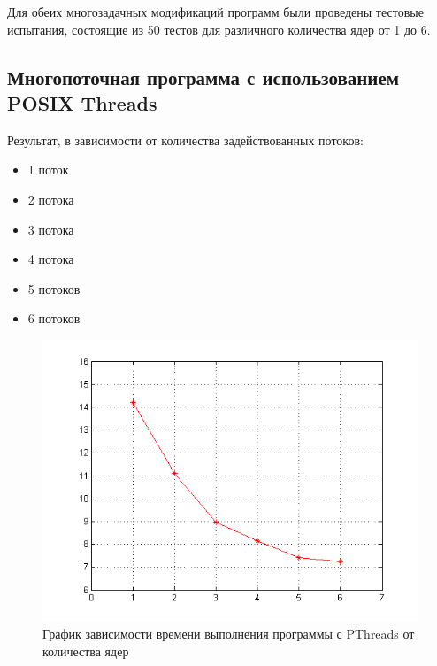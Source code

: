 Для обеих многозадачных модификаций программ были проведены тестовые испытания, состоящие из 50 тестов для различного количества ядер от 1 до 6.


\subsection{Многопоточная программа с использованием POSIX Threads}

Результат, в зависимости от количества задействованных потоков:

\begin{itemize}
	\item 1 поток
		
	\item 2 потока
		
	\item 3 потока
		
	\item 4 потока
		
	\item 5 потоков
		
	\item 6 потоков
		
\end{itemize}

\begin{figure}[H]
	\begin{center}
		\includegraphics[scale=0.7]{pic/posix.png}
		\caption{График зависимости времени выполнения программы с PThreads от количества ядер} 
		\label{pic:pic_name} %
	\end{center}
\end{figure}

